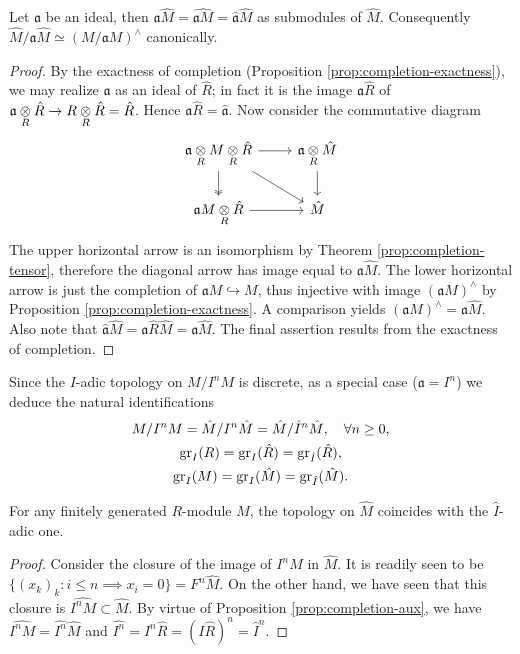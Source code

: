 \begin{proposition}\label{prop:completion-aux}
	Let $\mathfrak{a}$ be an ideal, then $\mathfrak{a} \hat{M} = \widehat{\mathfrak{a}M} = \hat{\mathfrak{a}}\hat{M}$ as submodules of $\hat{M}$. Consequently $\hat{M}/\mathfrak{a}\hat{M} \simeq (M/\mathfrak{a}M)^\wedge$ canonically.
\end{proposition}
\begin{proof}
	By the exactness of completion (Proposition \ref{prop:completion-exactness}), we may realize $\hat{\mathfrak{a}}$ as an ideal of $\hat{R}$; in fact it is the image $\mathfrak{a} \hat{R}$ of $\mathfrak{a} \underset{R}{\otimes} \hat{R} \to R \underset{R}{\otimes} \hat{R} = \hat{R}$. Hence $\mathfrak{a}\hat{R} = \hat{\mathfrak{a}}$. Now consider the commutative diagram
	\[\begin{tikzcd}
		\mathfrak{a} \dotimes{R} M \dotimes{R} \hat{R} \arrow[r] \arrow[rd] \arrow[twoheadrightarrow, d] & \mathfrak{a} \dotimes{R} \hat{M} \arrow[d] \\
		\mathfrak{a}M \dotimes{R} \hat{R} \arrow[r] & \hat{M}
	\end{tikzcd}\]
	The upper horizontal arrow is an isomorphism by Theorem \ref{prop:completion-tensor}, therefore the diagonal arrow has image equal to $\mathfrak{a}\hat{M}$. The lower horizontal arrow is just the completion of $\mathfrak{a}M \hookrightarrow M$, thus injective with image $(\mathfrak{a}M)^\wedge$ by Proposition \ref{prop:completion-exactness}. A comparison yields $(\mathfrak{a}M)^\wedge = \mathfrak{a}\hat{M}$. Also note that $\hat{\mathfrak{a}}\hat{M} = \mathfrak{a}\hat{R}\hat{M} = \mathfrak{a}\hat{M}$. The final assertion results from the exactness of completion.
\end{proof}
Since the $I$-adic topology on $M/I^n M$ is discrete, as a special case ($\mathfrak{a} = I^n$) we deduce the natural identifications
\begin{gather*}
	M/I^n M = \hat{M}/I^n \hat{M} = \hat{M}/\hat{I}^n \hat{M}, \quad \forall n \geq 0, \\
	\operatorname{gr}_I(R) = \operatorname{gr}_I(\hat{R}) = \operatorname{gr}_{\hat{I}}(\hat{R}), \\
	\operatorname{gr}_I(M) = \operatorname{gr}_I(\hat{M}) = \operatorname{gr}_{\hat{I}}(\hat{M}).
\end{gather*}

\begin{proposition}\label{prop:completion-top}
	For any finitely generated $R$-module $M$, the topology on $\hat{M}$ coincides with the $\hat{I}$-adic one.
\end{proposition}
\begin{proof}
	Consider the closure of the image of $I^n M$ in $\hat{M}$. It is readily seen to be $\{(x_k)_k: i \leq n \implies x_i=0 \} = F^n \hat{M}$. On the other hand, we have seen that this closure is $\widehat{I^n M} \subset \hat{M}$. By virtue of Proposition \ref{prop:completion-aux}, we have $\widehat{I^n M} = \widehat{I^n}\hat{M}$ and $\widehat{I^n} = I^n \hat{R} = (I\hat{R})^n = \hat{I}^n$.
\end{proof}

